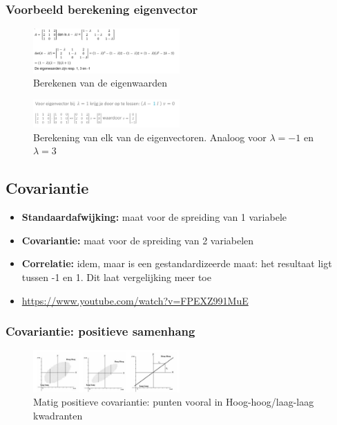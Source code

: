 \documentclass{article}
\begin{document}
\subsubsection{Voorbeeld berekening eigenvector}

\begin{figure}[H]
    \centering
    \includegraphics[width=0.5\textwidth]{eigenvector-berekening-voorbeeld.png}
    \caption{Berekenen van de eigenwaarden}
\end{figure}

\begin{figure}[H]
    \centering
    \includegraphics[width=0.5\textwidth]{eigenvector-berekening-voorbeeld2.png}
    \caption{Berekening van elk van de eigenvectoren. Analoog voor $\lambda = -1$ en $\lambda = 3$}
\end{figure}

\subsection{Covariantie}

\begin{itemize}
    \item \textbf{Standaardafwijking:} maat voor de spreiding van 1 variabele
    \item \textbf{Covariantie:} maat voor de spreiding van 2 variabelen
    \item \textbf{Correlatie:} idem, maar is een gestandardizeerde maat: het resultaat ligt tussen -1 en 1. Dit laat vergelijking meer toe
    \item \url{https://www.youtube.com/watch?v=FPEXZ991MuE}
\end{itemize}

\subsubsection{Covariantie: positieve samenhang}

\begin{figure}[H]
    \centering
    \includegraphics[width=0.5\textwidth]{covariantie-positieve-samenhang.png}
    \caption{Matig positieve covariantie: punten vooral in Hoog-hoog/laag-laag kwadranten}
\end{figure}
\end{document}
